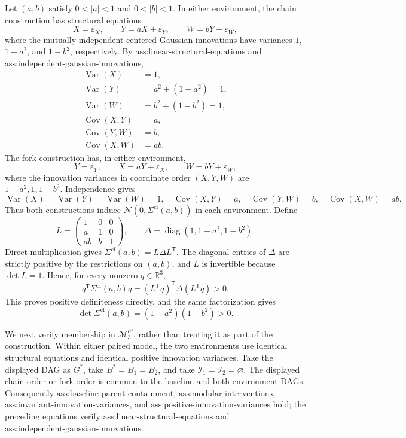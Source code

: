 Let \((a,b)\) satisfy \(0<|a|<1\) and \(0<|b|<1\).  In either environment, the chain construction has structural equations
\[
 X=\varepsilon_X,\qquad
 Y=aX+\varepsilon_Y,\qquad
 W=bY+\varepsilon_W,
\]
where the mutually independent centered Gaussian innovations have variances \(1\), \(1-a^2\), and \(1-b^2\), respectively.  By \(\text{ass:linear-structural-equations}\) and \(\text{ass:independent-gaussian-innovations}\),
\[
\begin{aligned}
 \operatorname{Var}(X)&=1,\\
 \operatorname{Var}(Y)&=a^2+(1-a^2)=1,\\
 \operatorname{Var}(W)&=b^2+(1-b^2)=1,\\
 \operatorname{Cov}(X,Y)&=a,\\
 \operatorname{Cov}(Y,W)&=b,\\
 \operatorname{Cov}(X,W)&=ab.
\end{aligned}
\]
The fork construction has, in either environment,
\[
 Y=\varepsilon_Y,\qquad
 X=aY+\varepsilon_X,\qquad
 W=bY+\varepsilon_W,
\]
where the innovation variances in coordinate order \((X,Y,W)\) are \(1-a^2,1,1-b^2\).  Independence gives
\[
 \operatorname{Var}(X)=\operatorname{Var}(Y)=\operatorname{Var}(W)=1,
 \quad
 \operatorname{Cov}(X,Y)=a,
 \quad
 \operatorname{Cov}(Y,W)=b,
 \quad
 \operatorname{Cov}(X,W)=ab.
\]
Thus both constructions induce \(\mathcal N(0,\Sigma^{\mathrm{cf}}(a,b))\) in each environment.  Define
\[
 L=\begin{pmatrix}1&0&0\\a&1&0\\ab&b&1\end{pmatrix},
 \qquad
 \Delta=\operatorname{diag}(1,1-a^2,1-b^2).
\]
Direct multiplication gives \(\Sigma^{\mathrm{cf}}(a,b)=L\Delta L^{\mathsf T}\).  The diagonal entries of \(\Delta\) are strictly positive by the restrictions on \((a,b)\), and \(L\) is invertible because \(\det L=1\).  Hence, for every nonzero \(q\in\mathbb R^3\),
\[
 q^{\mathsf T}\Sigma^{\mathrm{cf}}(a,b)q
 =(L^{\mathsf T}q)^{\mathsf T}\Delta(L^{\mathsf T}q)>0.
\]
This proves positive definiteness directly, and the same factorization gives
\[
 \det\Sigma^{\mathrm{cf}}(a,b)=(1-a^2)(1-b^2)>0.
\]

We next verify membership in \(\mathcal M_3^{\mathrm{df}}\), rather than treating it as part of the construction.  Within either paired model, the two environments use identical structural equations and identical positive innovation variances.  Take the displayed DAG as \(G^*\), take \(B^*=B_1=B_2\), and take \(\mathcal I_1=\mathcal I_2=\varnothing\).  The displayed chain order or fork order is common to the baseline and both environment DAGs.  Consequently \(\text{ass:baseline-parent-containment}\), \(\text{ass:modular-interventions}\), \(\text{ass:invariant-innovation-variances}\), and \(\text{ass:positive-innovation-variances}\) hold; the preceding equations verify \(\text{ass:linear-structural-equations}\) and \(\text{ass:independent-gaussian-innovations}\).

